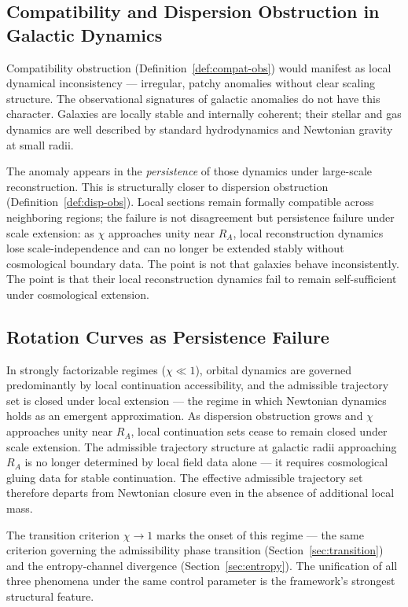 \documentclass[11pt, a4paper]{article}
\theoremstyle{plain}
\theoremstyle{definition}
\theoremstyle{remark}
\newcommand{\RA}{R_{\!A}}
\begin{document}
\subsection{Compatibility and Dispersion Obstruction in Galactic Dynamics}

Compatibility obstruction (Definition~\ref{def:compat-obs}) would manifest as local
dynamical inconsistency --- irregular, patchy anomalies without clear scaling
structure. The observational signatures of galactic anomalies do not have this
character. Galaxies are locally stable and internally coherent; their stellar and gas
dynamics are well described by standard hydrodynamics and Newtonian gravity at small
radii.

The anomaly appears in the \emph{persistence} of those dynamics under large-scale
reconstruction. This is structurally closer to dispersion obstruction
(Definition~\ref{def:disp-obs}). Local sections remain formally compatible across
neighboring regions; the failure is not disagreement but persistence failure under
scale extension: as $\chi$ approaches unity near $\RA$, local reconstruction dynamics
lose scale-independence and can no longer be extended stably without cosmological
boundary data. The point is not that galaxies behave inconsistently. The point is
that their local reconstruction dynamics fail to remain self-sufficient under
cosmological extension.

\subsection{Rotation Curves as Persistence Failure}

In strongly factorizable regimes ($\chi \ll 1$), orbital dynamics are governed
predominantly by local continuation accessibility, and the admissible trajectory set
is closed under local extension --- the regime in which Newtonian dynamics holds as
an emergent approximation. As dispersion obstruction grows and $\chi$ approaches
unity near $\RA$, local continuation sets cease to remain closed under scale
extension. The admissible trajectory structure at galactic radii approaching $\RA$
is no longer determined by local field data alone --- it requires cosmological gluing
data for stable continuation. The effective admissible trajectory set therefore
departs from Newtonian closure even in the absence of additional local mass.

The transition criterion $\chi \to 1$ marks the onset of this regime --- the same
criterion governing the admissibility phase transition
(Section~\ref{sec:transition}) and the entropy-channel divergence
(Section~\ref{sec:entropy}). The unification of all three phenomena under the same
control parameter is the framework's strongest structural feature.
\end{document}
